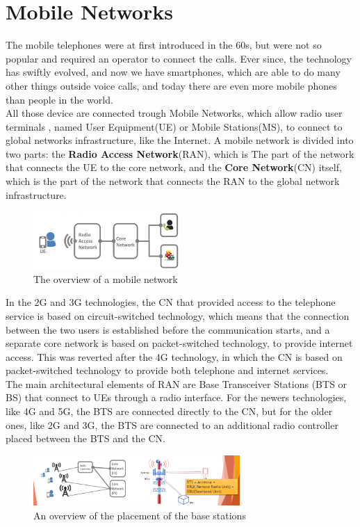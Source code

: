 \chapter{Mobile Networks}
The mobile telephones were at first introduced in the 60s, but were not so popular and required an
operator to connect the calls. Ever since, the technology has swiftly evolved, and now we have
smartphones, which are able to do many other things outside voice calls, and today there are even
more mobile phones than people in the world.\\ 
All those device are connected trough Mobile Networks, which allow radio user terminals , named User
Equipment(UE) or Mobile Stations(MS), to connect to global networks infrastructure, like the
Internet. A mobile network is divided into two parts: the \textbf{Radio Access Network}(RAN), which
is The part of the network that connects the UE to the core network, and the \textbf{Core
Network}(CN) itself, which is the part of the network that connects the RAN to the global network
infrastructure.\\
\begin{figure}[h]
  \centering
  \includegraphics[width=0.5\textwidth]{img/wireless/mobile network overview.png}
  \caption{The overview of a mobile network}
  \label{fig:mobile-network}
\end{figure}
In the 2G and 3G technologies, the CN that provided access to the telephone service is based on
circuit-switched technology, which means that the connection between the two users is established
before the communication starts, and a separate core network is based on packet-switched technology,
to provide internet access. This was reverted after the 4G technology, in which the CN is based on
packet-switched technology to provide both telephone and internet services.\\
The main architectural elements of RAN are Base Transceiver Stations (BTS or BS) that
connect to UEs through a radio interface. For the newers technologies, like 4G and 5G, the BTS are
connected directly to the CN, but for the older ones, like 2G and 3G, the BTS are connected to an
additional radio controller placed between the BTS and the CN.\\
\begin{figure}[h]
  \centering
  \includegraphics[width=0.7\textwidth]{img/wireless/mobile base stations.png}
  \caption{An overview of the placement of the base stations}
  \label{fig:mobile-architecture}
\end{figure}
